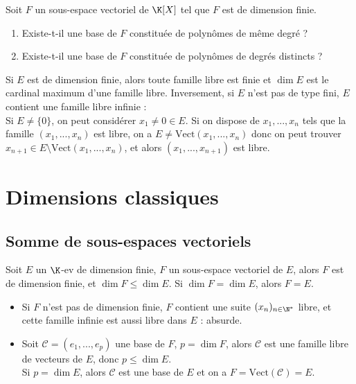 \documentclass[12pt, a4paper]{report}
\begin{document}
\begin{remarque}
Soit $F$ un sous-espace vectoriel de $\K[X]$ tel que $F$ est de dimension finie. \\
\begin{enumerate}
	\item Existe-t-il une base de $F$ constituée de polynômes de même degré ?
	\item Existe-t-il une base de $F$ constituée de polynômes de degrés distincts ?
\end{enumerate}
\end{remarque}


\begin{remarque}
Si $E$ est de dimension finie, alors toute famille libre est finie et $\dim E$ est le cardinal maximum d'une famille libre. Inversement, si $E$ n'est pas de type fini, $E$ contient une famille libre infinie : \\
Si $E \ne \{0\}$, on peut considérer $x_1 \ne 0 \in E$. Si on dispose de $x_1,...,x_n$ tels que la famille $(x_1,...,x_n)$ est libre, on a $E \ne \text{Vect}(x_1,...,x_n)$ donc on peut trouver $x_{n+1} \in E \setminus \text{Vect}(x_1,...,x_n)$, et alors $(x_1,...,x_{n+1})$ est libre.
\end{remarque}

\newpage

\section{Dimensions classiques}
\subsection{Somme de sous-espaces vectoriels}

\begin{theoreme}{}{}
Soit $E$ un $\K$-ev de dimension finie, $F$ un sous-espace vectoriel de $E$, alors $F$ est de dimension finie, et $\dim F \le \dim E$. Si $\dim F = \dim E$, alors $F = E$.
\end{theoreme}

\begin{demo}{}
\begin{itemize}
	\item Si $F$ n'est pas de dimension finie, $F$ contient une suite $(x_n)_{n \in \N^*}$ libre, et cette famille infinie est aussi libre dans $E$ : absurde.
	\item
	Soit $\mathcal{C} = (e_1,...,e_p)$ une base de $F$, $p = \dim F$, alors $\mathcal{C}$ est une famille libre de vecteurs de $E$, donc $p \le \dim E$. \\
	Si $p = \dim E$, alors $\mathcal{C}$ est une base de $E$ et on a $F = \text{Vect}(\mathcal{C}) = E$. 	
\end{itemize}
\end{demo}
\end{document}
